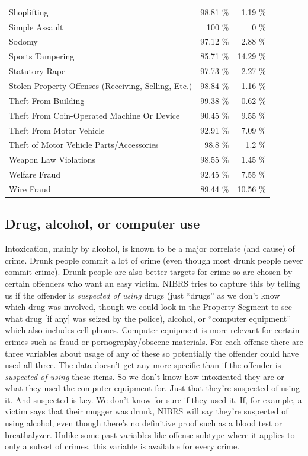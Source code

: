 \documentclass[
  12pt,
  openany]{book}
\begin{document}
\begin{longtable}[]{@{}lrr@{}}
Shoplifting & 98.81 \% & 1.19 \%\tabularnewline
Simple Assault & 100 \% & 0 \%\tabularnewline
Sodomy & 97.12 \% & 2.88 \%\tabularnewline
Sports Tampering & 85.71 \% & 14.29 \%\tabularnewline
Statutory Rape & 97.73 \% & 2.27 \%\tabularnewline
Stolen Property Offenses (Receiving, Selling, Etc.) & 98.84 \% & 1.16 \%\tabularnewline
Theft From Building & 99.38 \% & 0.62 \%\tabularnewline
Theft From Coin-Operated Machine Or Device & 90.45 \% & 9.55 \%\tabularnewline
Theft From Motor Vehicle & 92.91 \% & 7.09 \%\tabularnewline
Theft of Motor Vehicle Parts/Accessories & 98.8 \% & 1.2 \%\tabularnewline
Weapon Law Violations & 98.55 \% & 1.45 \%\tabularnewline
Welfare Fraud & 92.45 \% & 7.55 \%\tabularnewline
Wire Fraud & 89.44 \% & 10.56 \%\tabularnewline
\bottomrule
\end{longtable}

\hypertarget{drug-alcohol-or-computer-use}{%
\subsection{Drug, alcohol, or computer use}\label{drug-alcohol-or-computer-use}}

Intoxication, mainly by alcohol, is known to be a major correlate (and cause) of crime. Drunk people commit a lot of crime (even though most drunk people never commit crime). Drunk people are also better targets for crime so are chosen by certain offenders who want an easy victim. NIBRS tries to capture this by telling us if the offender is \emph{suspected of using} drugs (just ``drugs'' as we don't know which drug was involved, though we could look in the Property Segment to see what drug {[}if any{]} was seized by the police), alcohol, or ``computer equipment'' which also includes cell phones. Computer equipment is more relevant for certain crimes such as fraud or pornography/obscene materials. For each offense there are three variables about usage of any of these so potentially the offender could have used all three. The data doesn't get any more specific than if the offender is \emph{suspected of using} these items. So we don't know how intoxicated they are or what they used the computer equipment for. Just that they're suspected of using it. And suspected is key. We don't know for sure if they used it. If, for example, a victim says that their mugger was drunk, NIBRS will say they're suspected of using alcohol, even though there's no definitive proof such as a blood test or breathalyzer. Unlike some past variables like offense subtype where it applies to only a subset of crimes, this variable is available for every crime.
\end{document}
